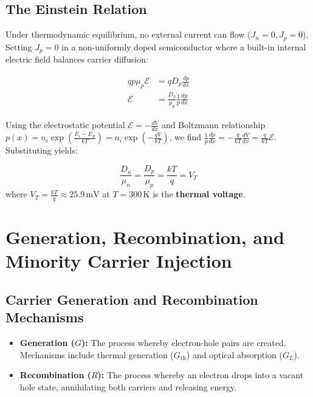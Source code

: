 \documentclass[12pt,a4paper]{article}
\begin{document}
\subsection{The Einstein Relation}
Under thermodynamic equilibrium, no external current can flow ($J_n = 0, J_p = 0$). Setting $J_p = 0$ in a non-uniformly doped semiconductor where a built-in internal electric field balances carrier diffusion:

\begin{align*}
  q p \mu_p \mathcal{E} &= q D_p \frac{dp}{dx} \\
  \mathcal{E} &= \frac{D_p}{\mu_p} \frac{1}{p} \frac{dp}{dx}
\end{align*}

Using the electrostatic potential $\mathcal{E} = -\frac{dV}{dx}$ and Boltzmann relationship $p(x) = n_i \exp\left(\frac{E_i - E_F}{kT}\right) = n_i \exp\left(-\frac{qV}{kT}\right)$, we find $\frac{1}{p}\frac{dp}{dx} = -\frac{q}{kT}\frac{dV}{dx} = \frac{q}{kT}\mathcal{E}$. Substituting yields:

\begin{tcolorbox}[formulabox, title={\textbf{Einstein Relation}}]
\begin{equation}
  \frac{D_n}{\mu_n} = \frac{D_p}{\mu_p} = \frac{k T}{q} = V_T
\end{equation}
where $V_T = \frac{kT}{q} \approx 25.9\,\text{mV}$ at $T = 300\,\text{K}$ is the \textbf{thermal voltage}.
\end{tcolorbox}

\section{Generation, Recombination, and Minority Carrier Injection}

\subsection{Carrier Generation and Recombination Mechanisms}
\begin{itemize}[leftmargin=*, itemsep=3pt]
  \item \textbf{Generation ($G$):} The process whereby electron-hole pairs are created. Mechanisms include thermal generation ($G_{\text{th}}$) and optical absorption ($G_L$).
  \item \textbf{Recombination ($R$):} The process whereby an electron drops into a vacant hole state, annihilating both carriers and releasing energy.
\end{itemize}
\end{document}
